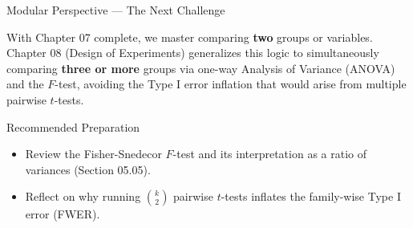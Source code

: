 \documentclass[10pt, aspectratio=169]{beamer}
\begin{document}
\begin{frame}{Modular Perspective --- The Next Challenge}
  \scriptsize
  \begin{retoclase}
    With Chapter 07 complete, we master comparing \textbf{two} groups or variables. Chapter 08 (Design of Experiments) generalizes this logic to simultaneously comparing \textbf{three or more} groups via one-way Analysis of Variance (ANOVA) and the $F$-test, avoiding the Type I error inflation that would arise from multiple pairwise $t$-tests.
  \end{retoclase}

  \vspace{0.08cm}
  \pause
  \begin{alertblock}{Recommended Preparation}
    \begin{itemize}\itemsep=0.06cm
      \item Review the Fisher-Snedecor $F$-test and its interpretation as a ratio of variances (Section 05.05).
      \item Reflect on why running $\binom{k}{2}$ pairwise $t$-tests inflates the family-wise Type I error (FWER).
    \end{itemize}
  \end{alertblock}
\end{frame}
\end{document}
